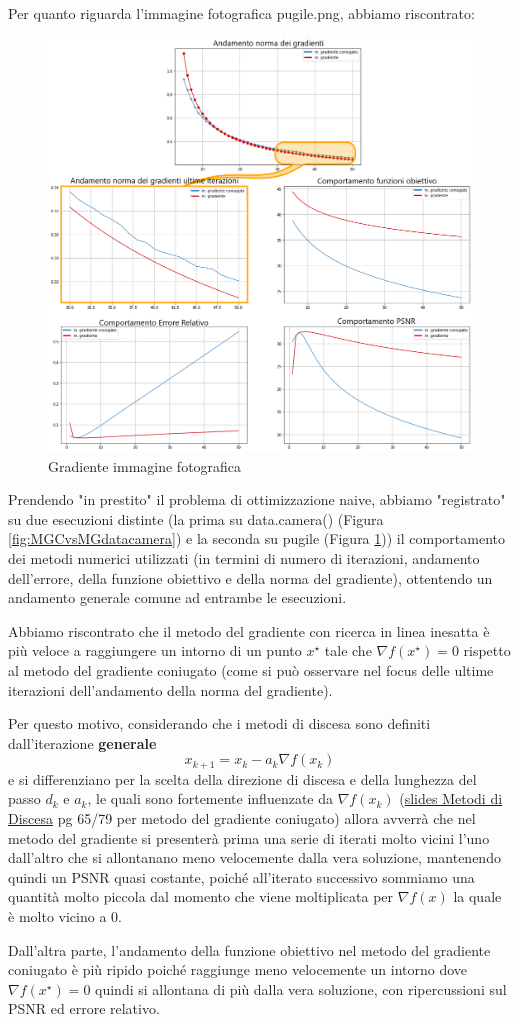 Per quanto riguarda l'immagine fotografica pugile.png, abbiamo riscontrato: 

\begin{figure}[H]
    \centering
    \includegraphics[width=\textwidth]{output/MGCvsMG-pugile-enph.png}
    \caption{Gradiente immagine fotografica}
    \label{fig:MGCvsMG-pugile}
\end{figure}

Prendendo "in prestito" il problema di ottimizzazione naive,
abbiamo "registrato" su due esecuzioni distinte (la prima su data.camera() 
(Figura \ref{fig:MGCvsMGdatacamera}) e la seconda su pugile 
(Figura \ref{fig:MGCvsMG-pugile}))
il comportamento dei metodi numerici utilizzati (in termini di numero di iterazioni, andamento 
dell'errore, della funzione obiettivo e della norma del gradiente), ottentendo un andamento 
generale comune ad entrambe le esecuzioni.

Abbiamo riscontrato che il metodo del gradiente con ricerca in linea inesatta è più veloce a
 raggiungere un intorno di un punto $x^{\star}$ tale che $\nabla f(x^{\star})=0$ rispetto al metodo del gradiente coniugato
 (come si può osservare nel focus delle ultime iterazioni dell'andamento della norma del gradiente).
 
Per questo motivo, considerando 
che i metodi di discesa sono definiti dall’iterazione \textbf{generale}
 \[x_{k+1} = x_k - a_k \nabla f(x_k)\]
 e si differenziano per la scelta della direzione di discesa e della lunghezza del passo $d_k$ e $a_k$, 
 le quali sono fortemente influenzate da $\nabla f(x_k)$ (\href{https://virtuale.unibo.it/mod/resource/view.php?id=750335}{slides Metodi di Discesa} pg 65/79 per metodo del gradiente coniugato)
allora avverrà che nel metodo del gradiente si presenterà prima una serie di iterati molto
 vicini l'uno dall'altro che si allontanano meno velocemente dalla vera soluzione, mantenendo quindi un PSNR
 quasi costante, poiché all'iterato successivo sommiamo una quantità molto piccola dal momento
 che viene moltiplicata per $\nabla f(x)$ la quale è molto vicino a 0. 

Dall'altra parte, l'andamento della funzione obiettivo nel metodo del gradiente coniugato è 
più ripido poiché raggiunge meno velocemente un intorno dove $\nabla f(x^{\star}) = 0$ quindi si allontana di più
 dalla vera soluzione, con ripercussioni sul PSNR ed errore relativo.